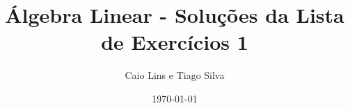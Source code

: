 \documentclass[leqno]{article}
\begin{document}
% 

\newcommand{\ds}{\displaystyle} \newcommand{\nl}{\newline}
\newcommand{\eps}{\varepsilon} \newcommand{\ssty}{\scriptstyle}
\newcommand{\bE}{\mathbb{E}}
\newcommand{\cB}{\mathcal{B}}
\newcommand{\cF}{\mathcal{F}}
\newcommand{\cA}{\mathcal{A}}
\newcommand{\cM}{\mathcal{M}}
\newcommand{\cD}{\mathcal{D}}
\newcommand{\cN}{\mathcal{N}}
\newcommand{\cL}{\mathcal{L}}
\newcommand{\cLN}{\mathcal{LN}}
\newcommand{\bP}{\mathbb{P}}
\newcommand{\bQ}{\mathbb{Q}}
\newcommand{\bN}{\mathbb{N}}
\newcommand{\bR}{\mathbb{R}}
\newcommand{\bZ}{\mathbb{Z}}

\newcommand{\bfw}{\mathbf{w}}
\newcommand{\bfv}{\mathbf{v}}
\newcommand{\bfu}{\mathbf{u}}
\newcommand{\bfb}{\mathbf{b}}
\newcommand{\bfx}{\mathbf{x}}
\newcommand{\bfa}{\mathbf{a}}

\newcommand{\bvecc}[2]{%
  \begin{bmatrix} #1 \\ #2  \end{bmatrix}
}
\newcommand{\bveccc}[3]{%
  \begin{bmatrix} #1 \\ #2 \\ #3  \end{bmatrix}
}


\title{Álgebra Linear - Soluções da Lista de Exercícios 1}

\author{Caio Lins e Tiago Silva}

\date{\today}

\maketitle
\end{document}
